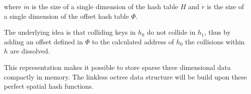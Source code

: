 \noindent where $\dot{m}$ is the size of a single dimension of the hash table $H$ and
$\dot{r}$ is the size of a single dimension of the offset hash table $\Phi$.

The underlying idea is that colliding keys in $\mathit{h}_0$ do not collide in
$\mathit{h}_1$, thus by adding an offset defined in $\Phi$ to the calculated
address of $\mathit{h}_0$ the collisions within $\mathit{h}$ are dissolved.

This representation makes it possible to store sparse three dimensional data
compactly in memory. The linkless octree data structure will be build upon these
perfect spatial hash functions.







